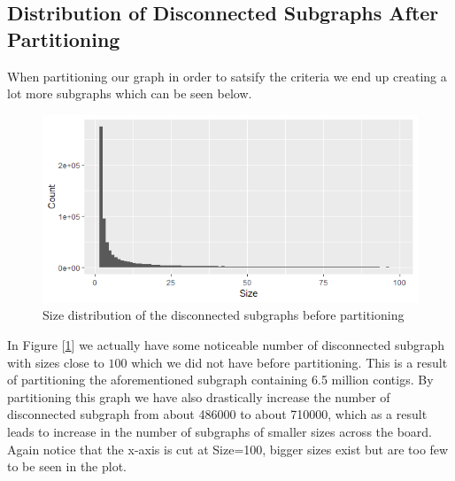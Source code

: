\documentclass[a4paper,10pt]{article}
\newcommand\bref[1]{[\ref{#1}]}
\begin{document}
\subsection{Distribution of Disconnected Subgraphs After Partitioning}

When partitioning our graph in order to satsify the criteria we end up creating a lot more subgraphs which can be seen below.

\begin{figure}[H]
	\centering
	\includegraphics[width=0.85\linewidth]{sizesafter.png}
	\caption{Size distribution of the disconnected subgraphs before partitioning}
	\label{fig:sizeafter}
\end{figure}

In Figure \bref{fig:sizeafter} we actually have some noticeable number of disconnected subgraph with sizes close to $100$ which we did not have before partitioning. This is a result of partitioning the aforementioned subgraph containing 6.5 million contigs. By partitioning this graph we have also drastically increase the number of disconnected subgraph from about 486000 to about 710000, which as a result leads to increase in the number of subgraphs of smaller sizes across the board. Again notice that the x-axis is cut at Size=100, bigger sizes exist but are too few to be seen in the plot.

\bigskip
\end{document}
